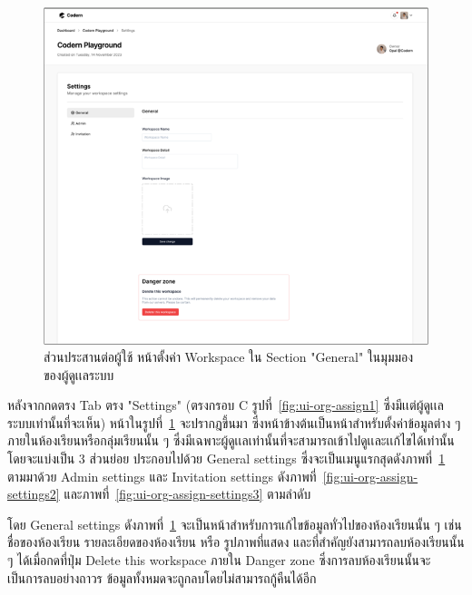 \documentclass[12pt,oneside,openright,a4paper]{cpe-thai-project}
\begin{document}
    \hypertarget{ui-org-assign-settings1}{
        \begin{figure}[H]
        \centering
            \includegraphics[width=15cm]{figure/ui/ui-assign-settings1.png}
            \caption[ส่วนประสานต่อผู้ใช้ หน้าตั้งค่า Workspace ของผู้ดูเเลระบบ (1)]{ส่วนประสานต่อผู้ใช้ หน้าตั้งค่า Workspace ใน Section "General" ในมุมมองของผู้ดูเเลระบบ}
            \label{fig:ui-org-assign-settings1}
        \end{figure}
    }
        
    \begin{flushleft}
     หลังจากกดตรง Tab ตรง "Settings" (ตรงกรอบ C รูปที่~\ref{fig:ui-org-assign1} ซึ่งมีเเต่ผู้ดูเเลระบบเท่านั้นที่จะเห็น) หน้าในรูปที่~\ref{fig:ui-org-assign-settings1} จะปรากฎขึ้นมา ซึ่งหน้าข้างต้นเป็นหน้าสำหรับตั้งค่าข้อมูลต่าง ๆ ภายในห้องเรียนหรือกลุ่มเรียนนั้น ๆ ซึ่งมีเฉพาะผู้ดูเเลเท่านั้นที่จะสามารถเข้าไปดูเเละเเก้ไขได้เท่านั้น โดยจะแบ่งเป็น 3 ส่วนย่อย ประกอบไปด้วย General settings ซึ่งจะเป็นเมนูแรกสุดดังภาพที่~\ref{fig:ui-org-assign-settings1} ตามมาด้วย Admin settings และ Invitation settings ดังภาพที่~\ref{fig:ui-org-assign-settings2} และภาพที่~\ref{fig:ui-org-assign-settings3} ตามลำดับ
    \end{flushleft}
    \begin{flushleft}
    โดย General settings ดังภาพที่~\ref{fig:ui-org-assign-settings1} จะเป็นหน้าสำหรับการแก้ไขข้อมูลทั่วไปของห้องเรียนนั้น ๆ เช่น ชื่อของห้องเรียน รายละเอียดของห้องเรียน หรือ รูปภาพที่แสดง และที่สำคัญยังสามารถลบห้องเรียนนั้น ๆ ได้เมื่อกดที่ปุ่ม Delete this workspace ภายใน Danger zone ซึ่งการลบห้องเรียนนั้นจะเป็นการลบอย่างถาวร ข้อมูลทั้งหมดจะถูกลบโดยไม่สามารถกู้คืนได้อีก 
    \end{flushleft}
\end{document}
